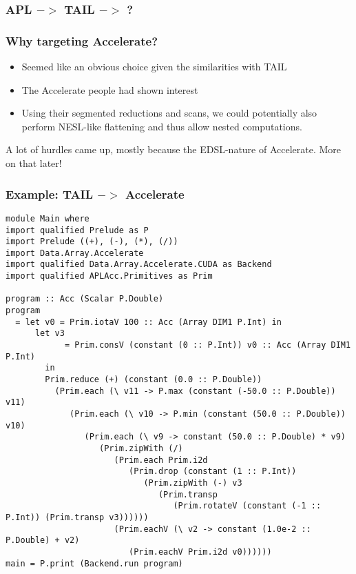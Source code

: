 \documentclass{beamer}
\begin{document}
\begin{frame}[fragile]
\frametitle{APL $->$ TAIL $->$ ?}

\end{frame}

\begin{frame}[fragile]
\frametitle{Why targeting Accelerate? }

\begin{itemize}
\item Seemed like an obvious choice given the similarities with TAIL
\item The Accelerate people had shown interest
\item Using their segmented reductions and scans, we could potentially
  also perform NESL-like flattening and thus allow nested computations.
\end{itemize}

A lot of hurdles came up, mostly because the EDSL-nature of
Accelerate. More on that later!
\end{frame}

\begin{frame}[fragile]
\frametitle{Example: TAIL $->$ Accelerate}

\tiny
\begin{verbatim}
module Main where
import qualified Prelude as P
import Prelude ((+), (-), (*), (/))
import Data.Array.Accelerate
import qualified Data.Array.Accelerate.CUDA as Backend
import qualified APLAcc.Primitives as Prim
 
program :: Acc (Scalar P.Double)
program
  = let v0 = Prim.iotaV 100 :: Acc (Array DIM1 P.Int) in
      let v3
            = Prim.consV (constant (0 :: P.Int)) v0 :: Acc (Array DIM1 P.Int)
        in
        Prim.reduce (+) (constant (0.0 :: P.Double))
          (Prim.each (\ v11 -> P.max (constant (-50.0 :: P.Double)) v11)
             (Prim.each (\ v10 -> P.min (constant (50.0 :: P.Double)) v10)
                (Prim.each (\ v9 -> constant (50.0 :: P.Double) * v9)
                   (Prim.zipWith (/)
                      (Prim.each Prim.i2d
                         (Prim.drop (constant (1 :: P.Int))
                            (Prim.zipWith (-) v3
                               (Prim.transp
                                  (Prim.rotateV (constant (-1 :: P.Int)) (Prim.transp v3))))))
                      (Prim.eachV (\ v2 -> constant (1.0e-2 :: P.Double) + v2)
                         (Prim.eachV Prim.i2d v0))))))
main = P.print (Backend.run program)
\end{verbatim}

\end{frame}
\end{document}

